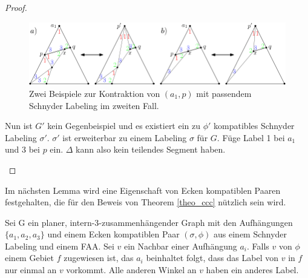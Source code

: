 \begin{proof}
\begin{description}
\begin{figure}[h]
	\centering
	  \includegraphics[width=1\textwidth]{lem3_2.png}
    	\caption{Zwei Beispiele zur Kontraktion von $(a_1,p)$ mit passendem Schnyder Labeling im zweiten Fall.}
    	\label{pic_lem3_2}
\end{figure}

Nun ist $G'$ kein Gegenbeispiel und es existiert ein zu $\phi'$ kompatibles Schnyder Labeling $\sigma'$. $\sigma'$ ist erweiterbar zu einem Labeling $\sigma$ für $G$. Füge Label 1 bei $a_1$ und 3 bei $p$ ein. $\Delta$ kann also kein teilendes Segment haben.
\end{description}
\end{proof}

Im nächsten Lemma wird eine Eigenschaft von Ecken kompatiblen Paaren festgehalten, die für den Beweis von Theorem \ref{theo_ccc} nützlich sein wird.

\begin{lemma}\label{lem4}
Sei G ein planer, intern-3-zusammenhängender Graph mit den Aufhängungen $\{a_1,a_2,a_3\}$ und einem Ecken kompatiblen Paar $(\sigma,\phi)$ aus einem Schnyder Labeling und einem FAA. Sei $v$ ein Nachbar einer Aufhängung $a_i$. Falls $v$ von $\phi$ einem Gebiet $f$ zugewiesen ist, das $a_i$ beinhaltet folgt, dass das Label von $v$ in $f$ nur einmal an $v$ vorkommt. Alle anderen Winkel an $v$ haben ein anderes Label.
\end{lemma}


